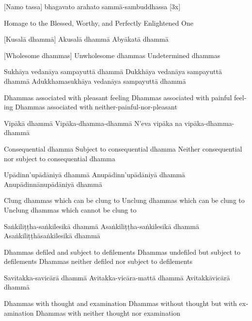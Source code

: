 [Namo tassa] bhagavato arahato sammā-sambuddhassa [3x]

\begin{english}
  Homage to the Blessed, Worthy, and Perfectly Enlightened One
\end{english}

[Kusalā dhammā]
Akusalā dhammā
Abyākatā dhammā

\begin{english}
  [Wholesome dhammas]
  Unwholesome dhammas
  Undetermined dhammas
\end{english}

Sukhāya vedanāya sampayuttā dhammā
Dukkhāya vedanāya sampayuttā dhammā
Adukkhamasukhāya vedanāya sampayuttā dhammā

\begin{english}
  Dhammas associated with pleasant feeling
  Dhammas associated with painful feeling
  Dhammas associated with neither-painful-nor-pleasant
\end{english}

Vipākā dhammā
Vipāka-dhamma-dhammā
N’eva vipāka na vipāka-dhamma-dhammā

\begin{english}
  Consequential dhamma
  Subject to consequential dhamma
  Neither consequential nor subject to consequential dhamma
\end{english}

Upādinn’upādāniyā dhammā
Anupādinn’upādāniyā dhammā
Anupādinnānupādāniyā dhammā

\begin{english}
  Clung dhammas which can be clung to
  Unclung dhammas which can be clung to
  Unclung dhammas which cannot be clung to
\end{english}

Saṅkiliṭṭha-saṅkilesikā dhammā
Asaṅkiliṭṭha-saṅkilesikā dhammā
Asaṅkiliṭṭhāsaṅkilesikā dhammā

\begin{english}
  Dhammas defiled and subject to defilements
  Dhammas undefiled but subject to defilements
  Dhammas neither defiled nor subject to defilements
\end{english}

Savitakka-savicārā dhammā
Avitakka-vicāra-mattā dhammā
Avitakkāvicārā dhammā

\begin{english}
  Dhammas with thought and examination
  Dhammas without thought but with examination
  Dhammas with neither thought nor examination
\end{english}

